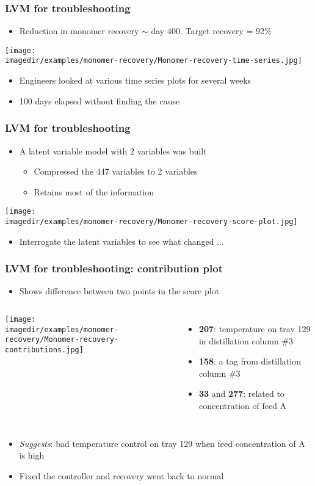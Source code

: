 \begin{frame}\frametitle{LVM for troubleshooting}
	\begin{itemize}
		\item	Reduction in monomer recovery $\sim$ day 400. Target recovery = 92\%
	\end{itemize}

	\texttt{[image: \\imagedir/examples/monomer-recovery/Monomer-recovery-time-series.jpg]}
	\begin{itemize}
		\item	Engineers looked at various time series plots for several weeks
		\item	100 days elapsed without finding the cause
	\end{itemize}
\end{frame}

\begin{frame}\frametitle{LVM for troubleshooting}
	\begin{itemize}
		\item	A latent variable model with 2 variables was built
		\begin{itemize}
			\item	Compressed the 447 variables to 2 variables
			\item	Retains most of the information
		\end{itemize}
	\end{itemize}

	\texttt{[image: \\imagedir/examples/monomer-recovery/Monomer-recovery-score-plot.jpg]}
	\begin{itemize}
		\item	Interrogate the latent variables to see what changed ...
	\end{itemize}
\end{frame}

\begin{frame}\frametitle{LVM for troubleshooting: contribution plot}
	\begin{itemize}
		\item	Shows difference between two points in the score plot
	\end{itemize}
	\begin{columns}
		\column{5cm}
		\texttt{[image: \\imagedir/examples/monomer-recovery/Monomer-recovery-contributions.jpg]} \column{5cm}
		\begin{itemize}
			\item	\textbf{207}: temperature on tray 129 in distillation column \#3
			\item	\textbf{158}: a tag from distillation column \#3
			\item	\textbf{33} and \textbf{277}: related to concentration of feed A
		\end{itemize}
	\end{columns}
	\begin{itemize}
		\item	\emph{Suggests}: bad temperature control on tray 129 when feed concentration of A is high
		\item	Fixed the controller and recovery went back to normal
	\end{itemize}
\end{frame}

